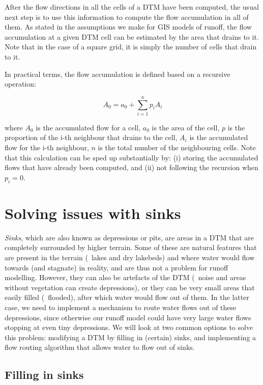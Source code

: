 After the flow directions in all the cells of a DTM have been computed, the usual next step is to use this information to compute the flow accumulation in all of them.
As stated in the assumptions we make for GIS models of runoff, the flow accumulation at a given DTM cell can be estimated by the area that drains to it.
Note that in the case of a square grid, it is simply the number of cells that drain to it.

In practical terms, the flow accumulation is defined based on a recursive operation:

\begin{equation}
A_0 = a_0 + \sum_{i=1}^{n} p_i A_i
\end{equation}

where \(A_0\) is the accumulated flow for a cell, \(a_0\) is the area of the cell, \(p\) is the proportion of the i-th neighbour that drains to the cell, \(A_i\) is the accumulated flow for the i-th neighbour, \(n\) is the total number of the neighbouring cells.
Note that this calculation can be sped up substantially by: (i) storing the accumulated flows that have already been computed, and (ii) not following the recursion when \(p_i = 0\).

\section{Solving issues with sinks}

\emph{Sinks}, which are also known as depressions or pits, are areas in a DTM that are completely surrounded by higher terrain.
Some of these are natural features that are present in the terrain (\eg\ lakes and dry lakebeds) and where water would flow towards (and stagnate) in reality, and are thus not a problem for runoff modelling.
However, they can also be artefacts of the DTM (\eg\ noise and areas without vegetation can create depressions), or they can be very small areas that easily filled (\ie\ flooded), after which water would flow out of them.
In the latter case, we need to implement a mechanism to route water flows out of these depressions, since otherwise our runoff model could have very large water flows stopping at even tiny depressions.
We will look at two common options to solve this problem: modifying a DTM by filling in (certain) sinks, and implementing a flow routing algorithm that allows water to flow out of sinks.

\subsection{Filling in sinks}%

